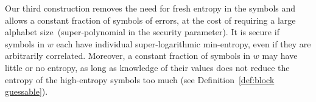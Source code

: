 \documentclass[11pt]{article}
\newcommand{\defref}[1]{\mbox{Definition~\ref{#1}}}
\newcommand{\consref}[1]{\mbox{Construction~\ref{#1}}}
\newcommand{\Huse}{\mathrm{H}_{\mathtt{usable}}}
\newcommand{\authnote}[2]{{\textcolor{red}{\textsf{#1 notes: }\textcolor{blue}{ #2}}\marginpar{\textcolor{red}{\textbf{!!!!!}}}}}
\newcommand{\authnote}[2]{}
\newcommand{\bnote}[1]{{\authnote{Ben}{#1}}}
\begin{document}
Our third construction removes the need for fresh entropy in the symbols and allows a constant fraction of symbols of errors, at the cost of requiring a large alphabet size~(super-polynomial in the security parameter).
It is secure if symbols in $w$
each have individual super-logarithmic min-entropy, even if they are arbitrarily correlated. Moreover,
a constant fraction of symbols in $w$ may have little or no entropy, as long as knowledge of their values does not reduce the entropy of the high-entropy symbols too much (see \defref{def:block guessable}).  %
%
%
\end{document}
